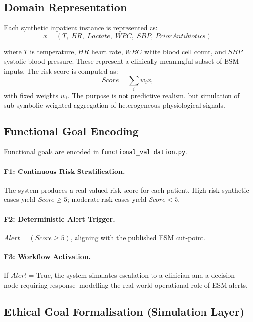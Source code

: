\documentclass[]{UCD_CS_41820_Report}
\begin{document}
\subsection{Domain Representation}

Each synthetic inpatient instance is represented as:
\[
  x = (T,\; HR,\; Lactate,\; WBC,\; SBP,\; PriorAntibiotics)
\]

where $T$ is temperature, $HR$ heart rate, $WBC$ white blood cell count, and $SBP$
systolic blood pressure. These represent a clinically meaningful subset of ESM inputs.
The risk score is computed as:
\[
  Score = \sum_i w_i x_i
\]
with fixed weights $w_i$. The purpose is not predictive realism, but simulation of
sub-symbolic weighted aggregation of heterogeneous physiological signals.

\subsection{Functional Goal Encoding}

Functional goals are encoded in \texttt{functional\_validation.py}.

\paragraph{F1: Continuous Risk Stratification.}
The system produces a real-valued risk score for each patient. High-risk synthetic
cases yield $Score \geq 5$; moderate-risk cases yield $Score < 5$.

\paragraph{F2: Deterministic Alert Trigger.}
$Alert = (Score \geq 5)$, aligning with the published ESM cut-point.

\paragraph{F3: Workflow Activation.}
If $Alert = \text{True}$, the system simulates escalation to a clinician and a
decision node requiring response, modelling the real-world operational role of
ESM alerts.

\subsection{Ethical Goal Formalisation (Simulation Layer)}
\end{document}
